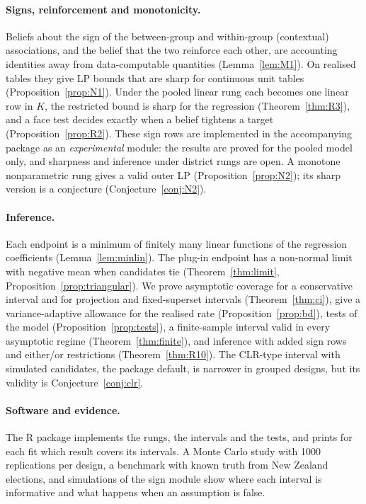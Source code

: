 \paragraph{Signs, reinforcement and monotonicity.} Beliefs about the sign of the
between-group and within-group (contextual) associations, and the belief that the
two reinforce each other, are accounting identities away from data-computable
quantities (Lemma~\ref{lem:M1}). On realised tables they give LP bounds that are
sharp for continuous unit tables (Proposition~\ref{prop:N1}). Under the pooled
linear rung each becomes one linear row in $K$, the restricted bound is sharp for
the regression (Theorem~\ref{thm:R3}), and a face test decides exactly when a
belief tightens a target (Proposition~\ref{prop:R2}). These sign rows are
implemented in the accompanying package as an \emph{experimental} module: the
results are proved for the pooled model only, and sharpness and inference under
district rungs are open. A monotone nonparametric rung gives a valid outer LP
(Proposition~\ref{prop:N2}); its sharp version is a conjecture
(Conjecture~\ref{conj:N2}).

\paragraph{Inference.} Each endpoint is a minimum of finitely many linear
functions of the regression coefficients (Lemma~\ref{lem:minlin}). The plug-in
endpoint has a non-normal limit with negative mean when candidates tie
(Theorem~\ref{thm:limit}, Proposition~\ref{prop:triangular}). We prove asymptotic
coverage for a conservative interval and for projection and fixed-superset
intervals (Theorem~\ref{thm:ci}), give a variance-adaptive allowance for the
realised rate (Proposition~\ref{prop:bd}), tests of the model
(Proposition~\ref{prop:tests}), a finite-sample interval valid in every
asymptotic regime (Theorem~\ref{thm:finite}), and inference with added sign rows
and either/or restrictions (Theorem~\ref{thm:R10}). The CLR-type interval with
simulated candidates, the package default, is narrower in grouped designs, but
its validity is Conjecture~\ref{conj:clr}.

\paragraph{Software and evidence.} The R package  implements the
rungs, the intervals and the tests, and prints for each fit which result covers
its intervals. A Monte Carlo study with 1000 replications per design, a benchmark
with known truth from New Zealand elections, and simulations of the sign module
show where each interval is informative and what happens when an assumption is
false.

